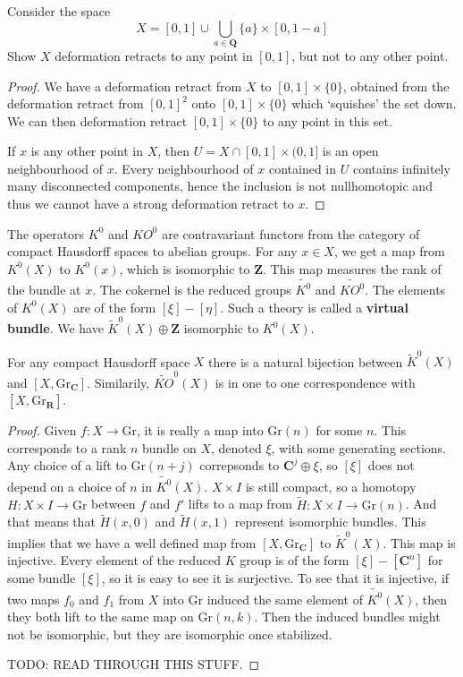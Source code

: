 \begin{theorem}
    Consider the space
    \[ X = [0,1] \cup \bigcup_{a \in \mathbf{Q}} \{ a \} \times [0,1-a] \]
    Show $X$ deformation retracts to any point in $[0,1]$, but not to any other point.
\end{theorem}
\begin{proof}
    We have a deformation retract from $X$ to $[0,1] \times \{ 0 \}$, obtained from the deformation retract from $[0,1]^2$ onto $[0,1] \times \{ 0 \}$ which `squishes' the set down. We can then deformation retract $[0,1] \times \{ 0 \}$ to any point in this set.

    If $x$ is any other point in $X$, then $U = X \cap [0,1] \times (0,1]$ is an open neighbourhood of $x$. Every neighbourhood of $x$ contained in $U$ contains infinitely many disconnected components, hence the inclusion is not nullhomotopic and thus we cannot have a strong deformation retract to $x$.
\end{proof}

The operators $K^0$ and $KO^0$ are contravariant functors from the category of compact Hausdorff spaces to abelian groups. For any $x \in X$, we get a map from $K^0(X)$ to $K^0(x)$, which is isomorphic to $\mathbf{Z}$. This map measures the rank of the bundle at $x$. The cokernel is the reduced groups $\widetilde{K^0}$ and $\widetilde{KO^0}$. The elements of $K^0(X)$ are of the form $[\xi] - [\eta]$. Such a theory is called a {\bf virtual bundle}. We have $\widetilde{K}^0(X) \oplus \mathbf{Z}$ isomorphic to $K^0(X)$.

\begin{theorem}
    For any compact Hausdorff space $X$ there is a natural bijection between $\widetilde{K}^0(X)$ and $[X,\text{Gr}_{\mathbf{C}}]$. Similarily, $\widetilde{KO}^0(X)$ is in one to one correspondence with $[X,\text{Gr}_{\mathbf{R}}]$.
\end{theorem}
\begin{proof}
    Given $f: X \to \text{Gr}$, it is really a map into $\text{Gr}(n)$ for some $n$. This corresponds to a rank $n$ bundle on $X$, denoted $\xi$, with some generating sections. Any choice of a lift to $\text{Gr}(n + j)$ correpsonds to $\mathbf{C}^j \oplus \xi$, so $[\xi]$ does not depend on a choice of $n$ in $\widetilde{K^0}(X)$. $X \times I$ is still compact, so a homotopy $H: X \times I \to \text{Gr}$ between $f$ and $f'$ lifts to a map from $\tilde{H}: X \times I \to \text{Gr}(n)$. And that means that $\tilde{H}(x,0)$ and $\tilde{H}(x,1)$ represent isomorphic bundles. This implies that we have a well defined map from $[X,\text{Gr}_{\mathbf{C}}]$ to $\widetilde{K}^0(X)$. This map is injective. Every element of the reduced $K$ group is of the form $[\xi] - [\mathbf{C}^n]$ for some bundle $[\xi]$, so it is easy to see it is surjective. To see that it is injective, if two maps $f_0$ and $f_1$ from $X$ into $\text{Gr}$ induced the same element of $\widetilde{K^0}(X)$, then they both lift to the same map on $\text{Gr}(n,k)$. Then the induced bundles might not be isomorphic, but they are isomorphic once stabilized.

    TODO: READ THROUGH THIS STUFF.
\end{proof}

